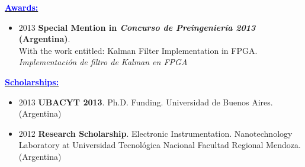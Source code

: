 \documentclass{article}
\newcommand{\statement}[1]{\par\medskip
  \underline{\textcolor{blue}{\textbf{#1:}}}\space
}
\begin{document}
\statement{Awards}
\begin{itemize}
	\item 2013 \textbf{Special Mention in \textit{Concurso de Preingenier\'ia 2013} (Argentina)}.\\
With the work entitled: Kalman Filter Implementation in FPGA.
{\it Implementaci\'on de filtro de Kalman en FPGA}
\end{itemize}
 




\statement{Scholarships}

\begin{itemize}
	\item 2013 \textbf{UBACYT 2013}. Ph.D. Funding. Universidad de Buenos Aires. (Argentina)
	\item 2012 \textbf{Research Scholarship}. Electronic Instrumentation.
		Nanotechnology Laboratory at Universidad Tecnol\'ogica Nacional Facultad Regional Mendoza. (Argentina)
\end{itemize}
 
\end{document}
